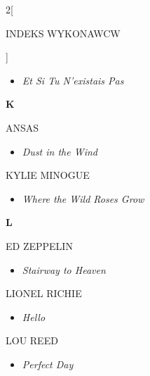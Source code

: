 \documentclass[a4paper]{report}
\begin{document}
\begin{multicols*}{2}[\begin{Huge}INDEKS WYKONAWCW\end{Huge}\vspace{1cm}]
\begin{minipage}{\columnwidth}
\begin{itemize}[topsep=3pt, after=\vspace{3mm}]
		\itemsep0em
		\item[]\textit{Et Si Tu N'existais Pas}  \\
	\end{itemize}
\end{minipage}
\begin{minipage}{\columnwidth}
	\begin{Large}\textbf{K}\end{Large}ANSAS 
	\begin{itemize}[topsep=3pt, after=\vspace{3mm}]
		\itemsep0em
		\item[]\textit{Dust in the Wind}  \\
	\end{itemize}
\end{minipage}
\begin{minipage}{\columnwidth}
	KYLIE MINOGUE 
	\begin{itemize}[topsep=3pt, after=\vspace{3mm}]
		\itemsep0em
		\item[]\textit{Where the Wild Roses Grow}  \\
	\end{itemize}
\end{minipage}
\begin{minipage}{\columnwidth}
	\begin{Large}\textbf{L}\end{Large}ED ZEPPELIN 
	\begin{itemize}[topsep=3pt, after=\vspace{3mm}]
		\itemsep0em
		\item[]\textit{Stairway to Heaven}  \\
	\end{itemize}
\end{minipage}
\begin{minipage}{\columnwidth}
	LIONEL RICHIE 
	\begin{itemize}[topsep=3pt, after=\vspace{3mm}]
		\itemsep0em
		\item[]\textit{Hello}  \\
	\end{itemize}
\end{minipage}
\begin{minipage}{\columnwidth}
	LOU REED 
	\begin{itemize}[topsep=3pt, after=\vspace{3mm}]
		\itemsep0em
		\item[]\textit{Perfect Day}  \\

\end{itemize}
\end{minipage}
\end{multicols*}
\end{document}
